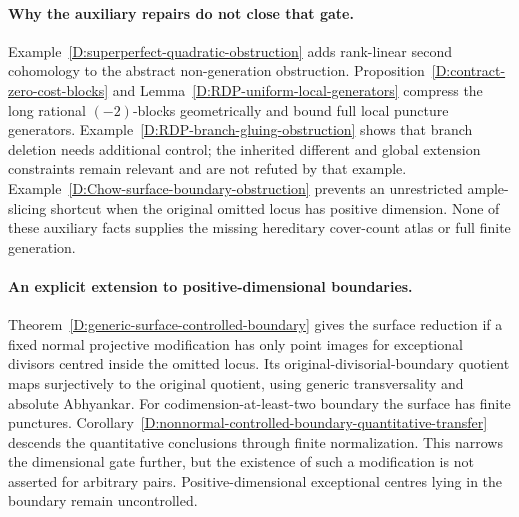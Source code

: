 \paragraph{Why the auxiliary repairs do not close that gate.}
Example~\ref{D:superperfect-quadratic-obstruction} adds rank-linear
second cohomology to the abstract non-generation obstruction.
Proposition~\ref{D:contract-zero-cost-blocks} and
Lemma~\ref{D:RDP-uniform-local-generators} compress the long rational
$(-2)$-blocks geometrically and bound full local puncture generators.
Example~\ref{D:RDP-branch-gluing-obstruction} shows that branch
deletion needs additional control; the inherited different and global
extension constraints remain relevant and are not refuted by that example.
Example~\ref{D:Chow-surface-boundary-obstruction} prevents an unrestricted
ample-slicing shortcut when the original omitted locus has positive
dimension. None of these auxiliary facts supplies the missing hereditary
cover-count atlas or full finite generation.


\paragraph{An explicit extension to positive-dimensional boundaries.}
Theorem~\ref{D:generic-surface-controlled-boundary} gives the surface
reduction if a fixed normal projective modification has only point
images for exceptional divisors centred inside the omitted locus.
Its original-divisorial-boundary quotient maps surjectively to the
original quotient, using generic transversality and absolute Abhyankar.
For codimension-at-least-two boundary the surface has finite punctures.
Corollary~\ref{D:nonnormal-controlled-boundary-quantitative-transfer}
descends the quantitative conclusions through finite normalization.
This narrows the dimensional gate further, but the existence of such
a modification is not asserted for arbitrary pairs. Positive-dimensional
exceptional centres lying in the boundary remain uncontrolled.


